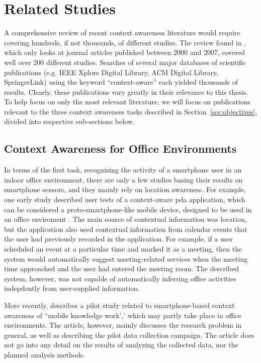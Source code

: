 \section{Related Studies}
\label{sec:literature}

A comprehensive review of recent context awareness literature would require covering hundreds, if not thousands, of different studies. The review found in \cite{Hong2009}, which only looks at journal articles published between 2000 and 2007, covered well over 200 different studies.  Searches of several major databases of scientific publications (e.g. IEEE Xplore Digital Library, ACM Digital Library, SpringerLink) using the keyword ``context-aware'' each yielded thousands of results. Clearly, these publications vary greatly in their relevance to this thesis. To help focus on only the most relevant literature, we will focus on publications relevant to the three context awareness tasks described in Section~\ref{sec:objectives}, divided into respective sub-sections below.

\subsection{Context Awareness for Office Environments}
\label{sec:office-literature}

In terms of the first task, recognizing the activity of a smartphone user in an indoor office environment, there are only a few studies basing their results on smartphone sensors, and they mainly rely on location awareness. For example, one early study described user tests of a context-aware \gls{pda} application, which can be considered a proto-smartphone-like mobile device, designed to be used in an office enviroment \cite{Tahti2004}. The main source of contextual information was location, but the application also used contextual information from calendar events that the user had previously recorded in the application. For example, if a user scheduled an event at a particular time and marked it as a meeting, then the system would automatically suggest meeting-related services when the meeting time approached and the user had entered the meeting room. The described system, however, was not capable of automatically inferring office activities indepdently from user-supplied information.

More recently, \cite{Heiskala2014} describes a pilot study related to smartphone-based context awareness of ``mobile knowledge work',' which may partly take place in office environments. The article, however, mainly discusses the research problem in general, as well as describing the pilot data collection campaign. The article does not go into any detail on the results of analyzing the collected data, nor the planned analysis methods.

